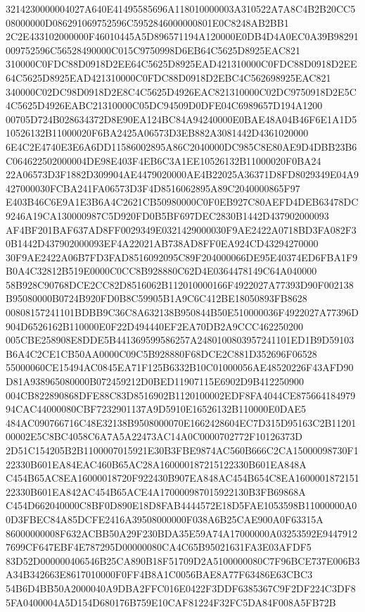 \documentclass[UTF8,fontset=fandol,zihao=-4,a4paper]{ctexart}
\begin{document}
{{3214230000004027A640E41495585696A118010000003A310522A7A8C4B2B20CC508000000D086291069752596C5952846000000801E0C8248AB2BB1
2C2E433102000000F46010445A5D896571194A120000E0DB4D4A0EC0A39B98291009752596C56528490000C015C9750998D6EB64C5625D8925EAC821
310000C0FDC88D0918D2EE64C5625D8925EAD421310000C0FDC88D0918D2EE64C5625D8925EAD421310000C0FDC88D0918D2EBC4C562698925EAC821
340000C02DC98D0918D2E8C4C5625D4926EAC821310000C02DC9750918D2E5C4C5625D4926EABC21310000C05DC94509D0DFE04C6989657D194A1200
00705D724B028634372D8E90EA124BC84A94240000E0BAE48A04B46F6E1A1D510526132B11000020F6BA2425A06573D3EB882A3081442D4361020000
6E4C2E4740E3E6A6DD11586002895A86C2040000DC985C8E80AE9D4DBB23B6C064622502000004DE98E403F4EB6C3A1EE10526132B11000020F0BA24
22A06573D3F1882D309904AE4479020000AE4B22025A36371D8FD8029349E04A9427000030FCBA241FA06573D3F4D8516062895A89C2040000865F97
E403B46C6E9A1E3B6A4C2621CB50980000C0F0EB927C80AEFD4DEB63478DC9246A19CA130000987C5D920FD0B5BF697DEC2830B1442D437902000093
AF4BF201BAF637AD8FF0029349E0321429000030F9AE2422A0718BD3FA082F30B1442D437902000093EF4A22021AB738AD8FF0EA924CD43294270000
30F9AE2422A06B7FD3FAD8516092095C89F204000066DE95E40374ED6FBA1F9B0A4C32812B519E0000C0CC8B928880C62D4E0364478149C64A040000
58B928C90768DCE2CC82D8516062B112010000166F4922027A77393D90F002138B95080000B0724B920FD0B8C59905B1A9C6C412BE18050893FB8628
00808157241101BDBB9C36C8A632138B950844B50E510000036F4922027A77396D904D6526162B110000E0F22D494440EF2EA70DB2A9CCC462250200
005CBE258908E8DDE5B441369599586257A2480100803957241101ED1B9D59103B6A4C2CE1CB50AA0000C09C5B928880F68DCE2C881D352696F06528
55000060CE15494AC0845EA71F125B6332B10C01000056AE48520226F43AFD90D81A938965080000B072459212D0BED11907115E6902D9B412250900
004CB822890868DFE88C83D8516902B1120100002EDF8FA4044CE87566418497994CAC44000080CBF7232901137A9D5910E16526132B110000E0DAE5
484AC090766716C48E32138B9508000070E1662428604EC7D315D95163C2B1120100002E5C8BC4058C6A7A5A22473AC14A0C0000702772F10126373D
2D51C154205B2B1100007015921E30B3FBE9874AC560B666C2CA15000098730F122330B601EA84EAC460B65AC28A160000187215122330B601EA848A
C454B65AC8EA16000018720F922430B907EA848AC454B654C8EA160000187215122330B601EA842AC454B65ACE4A170000987015922130B3FB69868A
C454D662040000C8BF0D890E18D8FAB4444572E18D5FAE1053598B11000000A00D3FBEC84A85DCFE2416A39508000000F038A6B25CAE900A0F63315A
86000000008F632ACBB50A29F230BDA35E59A74A17000000A03253592E94479127699CF647EBF4E787295D00000080CA4C65B95021631FA3E03AFDF5
83D52D000000406546B25CA890B18F51709D2A5100000080C7F96BCE737E006B3A34B342663E8617010000F0FF4B8A1C0056BAE8A77F63486E63CBC3
54B6D4BB50A2000040A9DBA2FFC016E0422F3DDF6385367C9F2DF224C3DF85FA0400004A5D154D680176B759E10CAF81224F32FC5DA84F008A5FB72B
}}
\end{document}
